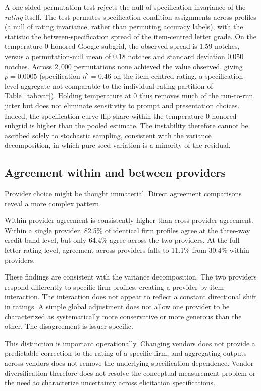 \documentclass[a4paper,fleqn]{cas-sc}
\begin{document}
A one-sided permutation test rejects the null of specification invariance of the \emph{rating} itself.
The test permutes specification-condition assignments across profiles (a null of rating invariance, rather
than permuting accuracy labels), with the statistic the between-specification spread of the item-centred
letter grade. On the temperature-0-honored Google subgrid, the observed spread is $1.59$ notches, versus
a permutation-null mean of $0.18$ notches and standard deviation $0.050$ notches. Across $2{,}000$ permutations
none achieved the value observed, giving $p=0.0005$ (specification $\eta^2=0.46$ on the item-centred
rating, a specification-level aggregate not comparable to the individual-rating partition of
Table~\ref{tab:var}). Holding temperature at 0 thus removes much of the run-to-run jitter but does not eliminate
sensitivity to prompt and presentation choices. Indeed, the specification-curve flip share within the
temperature-0-honored subgrid is higher than the pooled estimate. The instability therefore cannot be ascribed
solely to stochastic sampling, consistent with the variance decomposition, in which pure seed variation
is a minority of the residual.

\subsection{Agreement within and between providers}\label{sec:agreement}
Provider choice might be thought immaterial. Direct agreement
comparisons reveal a more complex pattern.

Within-provider agreement is consistently higher than cross-provider agreement. Within a single provider,
82.5\% of identical firm profiles agree at the three-way credit-band level, but only 64.4\% agree across
the two providers. At the full letter-rating level, agreement across providers falls to 11.1\% from
30.4\% within providers.

These findings are consistent with the variance decomposition. The two providers respond differently to
specific firm profiles, creating a provider-by-item interaction. The interaction does not appear to
reflect a constant directional shift in ratings. A simple global adjustment does not allow one provider to
be characterized as systematically more conservative or more generous than the other. The disagreement is
issuer-specific.

This distinction is important operationally. Changing vendors does not provide a predictable correction
to the rating of a specific firm, and aggregating outputs across vendors does not remove the underlying
specification dependence. Vendor diversification therefore does not resolve the conceptual measurement
problem or the need to characterize uncertainty across elicitation specifications.
\end{document}
